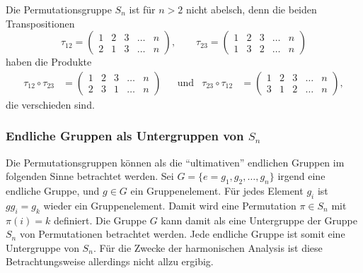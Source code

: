 Die Permutationsgruppe $S_n$ ist für $n>2$ nicht abelsch, denn die beiden
Transpositionen
\[
\tau_{12}
=
\begin{pmatrix}
1&2&3&\dots&n\\
2&1&3&\dots&n
\end{pmatrix}
,
\qquad
\tau_{23}
=
\begin{pmatrix}
1&2&3&\dots&n\\
1&3&2&\dots&n
\end{pmatrix}
\]
haben die Produkte
\begin{align*}
\tau_{12}
\circ
\tau_{23}
&=
\begin{pmatrix}
1&2&3&\dots&n\\
2&3&1&\dots&n
\end{pmatrix}
&&\text{und}&
\tau_{23}
\circ
\tau_{12}
&=
\begin{pmatrix}
1&2&3&\dots&n\\
3&1&2&\dots&n
\end{pmatrix},
\end{align*}
die verschieden sind.

%
%
\subsubsection{Endliche Gruppen als Untergruppen von $S_n$}
Die Permutationsgruppen können als die ``ultimativen'' endlichen Gruppen
im folgenden Sinne betrachtet werden.
Sei $G=\{e=g_1,g_2,\dots,g_n\}$ irgend eine endliche Gruppe, und $g\in G$
ein Gruppenelement.
Für jedes Element $g_i$ ist $gg_i=g_k$ wieder ein Gruppenelement.
Damit wird eine Permutation $\pi\in S_n$ mit $\pi(i)=k$ definiert.
Die Gruppe $G$ kann damit als eine Untergruppe der Gruppe $S_n$
von Permutationen betrachtet werden.
Jede endliche Gruppe ist somit eine Untergruppe von $S_n$.
Für die Zwecke der harmonischen Analysis ist diese Betrachtungsweise
allerdings nicht allzu ergibig.

%
%
